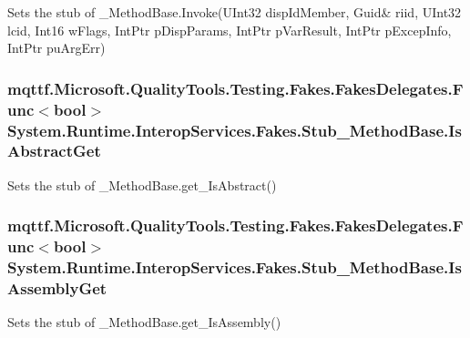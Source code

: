 Sets the stub of \-\_\-\-Method\-Base.\-Invoke(U\-Int32 disp\-Id\-Member, Guid\& riid, U\-Int32 lcid, Int16 w\-Flags, Int\-Ptr p\-Disp\-Params, Int\-Ptr p\-Var\-Result, Int\-Ptr p\-Excep\-Info, Int\-Ptr pu\-Arg\-Err)

\hypertarget{class_system_1_1_runtime_1_1_interop_services_1_1_fakes_1_1_stub___method_base_a183864001f6ccb8935c670cf7b67ee17}{
\subsubsection[{Is\-Abstract\-Get}]{\setlength{\rightskip}{0pt plus 5cm}mqttf.\-Microsoft.\-Quality\-Tools.\-Testing.\-Fakes.\-Fakes\-Delegates.\-Func$<$bool$>$ System.\-Runtime.\-Interop\-Services.\-Fakes.\-Stub\-\_\-\-Method\-Base.\-Is\-Abstract\-Get}}\label{class_system_1_1_runtime_1_1_interop_services_1_1_fakes_1_1_stub___method_base_a183864001f6ccb8935c670cf7b67ee17}


Sets the stub of \-\_\-\-Method\-Base.\-get\-\_\-\-Is\-Abstract()

\hypertarget{class_system_1_1_runtime_1_1_interop_services_1_1_fakes_1_1_stub___method_base_a070a8c2f742698d043cf59893817146e}{
\subsubsection[{Is\-Assembly\-Get}]{\setlength{\rightskip}{0pt plus 5cm}mqttf.\-Microsoft.\-Quality\-Tools.\-Testing.\-Fakes.\-Fakes\-Delegates.\-Func$<$bool$>$ System.\-Runtime.\-Interop\-Services.\-Fakes.\-Stub\-\_\-\-Method\-Base.\-Is\-Assembly\-Get}}\label{class_system_1_1_runtime_1_1_interop_services_1_1_fakes_1_1_stub___method_base_a070a8c2f742698d043cf59893817146e}


Sets the stub of \-\_\-\-Method\-Base.\-get\-\_\-\-Is\-Assembly()

